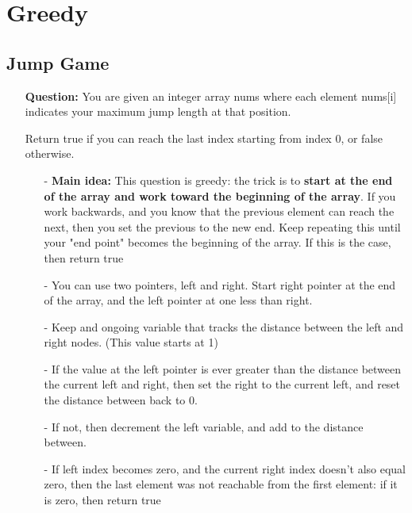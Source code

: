 \documentclass[12pt]{article}
\begin{document}
\section{Greedy}
\subsection{Jump Game}
\begin{enumerate}
  \item[] \textbf{Question:}
  You are given an integer array nums where each element nums[i] indicates your maximum jump length at that position.

  Return true if you can reach the last index starting from index 0, or false otherwise.
    \begin{enumerate}
      \item[-] \textbf{Main idea:} This question is greedy: the trick is to \textbf{start at the end of the array and work toward the beginning of the array}. If you work backwards, and you know that the previous element can reach the next, then you set the previous to the new end. Keep repeating this until your "end point" becomes the beginning of the array. If this is the case, then return true
      \item[-] You can use two pointers, left and right. Start right pointer at the end of the array, and the left pointer at one less than right.
      \item[-] Keep and ongoing variable that tracks the distance between the left and right nodes. (This value starts at 1)
      \item[-] If the value at the left pointer is ever greater than the distance between the current left and right, then set the right to the current left, and reset the distance between back to 0. 
      \item[-] If not, then decrement the left variable, and add to the distance between.
      \item[-] If left index becomes zero, and the current right index doesn't also equal zero, then the last element was not reachable from the first element: if it is zero, then return true
    \end{enumerate}
\end{enumerate}
\end{document}
